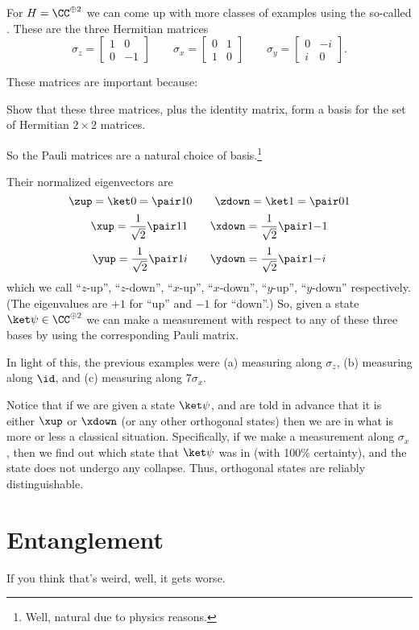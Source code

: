 For $H = \CC^{\oplus 2}$ we can come up with more classes of examples using
the so-called .
These are the three Hermitian matrices
\[
	\sigma_z = \begin{bmatrix} 1 & 0 \\ 0 & -1 \end{bmatrix}
	\qquad
	\sigma_x = \begin{bmatrix} 0 & 1 \\ 1 & 0 \end{bmatrix}
	\qquad
	\sigma_y = \begin{bmatrix} 0 & -i \\ i & 0 \end{bmatrix}.
\]

These matrices are important because:
\begin{ques}
	Show that these three matrices, plus the identity matrix,
	form a basis for the set of Hermitian $2 \times 2$ matrices.
\end{ques}
So the Pauli matrices are a natural choice of basis.\footnote{%
	Well, natural due to physics reasons.
}

Their normalized eigenvectors are
\[ \zup = \ket0 = \pair10 \qquad \zdown = \ket1 = \pair01 \]
\[ \xup = \frac{1}{\sqrt2}\pair11
	\qquad \xdown = \frac{1}{\sqrt2}\pair1{-1} \]
\[ \yup = \frac{1}{\sqrt2}\pair1i
	\qquad \ydown = \frac{1}{\sqrt2}\pair1{-i} \]
which we call ``$z$-up'', ``$z$-down'',
``$x$-up'', ``$x$-down'', ``$y$-up'', ``$y$-down'' respectively.
(The eigenvalues are $+1$ for ``up'' and $-1$ for ``down''.)
So, given a state $\ket\psi \in \CC^{\oplus 2}$
we can make a measurement with respect to any of these three bases
by using the corresponding Pauli matrix.

In light of this, the previous examples were
(a) measuring along $\sigma_z$,
(b) measuring along $\id$,
and (c) measuring along $7\sigma_x$.

Notice that if we are given a state $\ket\psi$,
and are told in advance that it is either $\xup$ or $\xdown$
(or any other orthogonal states)
then we are in what is more or less a classical situation.
Specifically, if we make a measurement along $\sigma_x$,
then we find out which state that $\ket\psi$ was in (with 100\% certainty),
and the state does not undergo any collapse.
Thus, orthogonal states are reliably distinguishable.

\section{Entanglement}
If you think that's weird, well, it gets worse.

